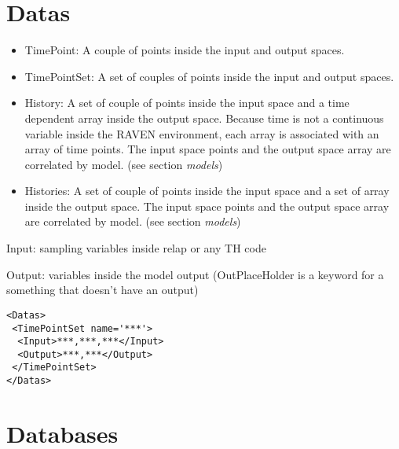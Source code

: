 \section{Datas  \\ \vspace{2 mm} {\small }}


\begin{itemize}
\item TimePoint: A couple of points inside the input and output spaces. 
\item TimePointSet: A set of couples of points inside the input and output spaces.  
\item History: A set of couple of points inside the input space and a time dependent array inside the output space. Because time is not a continuous variable inside the RAVEN environment, each array is associated with an array of time points. The input space points and the output space array are correlated by model. (see section \textit{models}) 	
\item Histories: A set of couple of points inside the input space and a set of array inside the output space. The input space points and the output space array are correlated by model. (see section \textit{models})
\end{itemize}

Input: sampling variables inside relap or any TH code

Output: variables inside the model output (OutPlaceHolder is a keyword for a something that doesn't have an output)

\begin{lstlisting}[style=XML]
<Datas> 
 <TimePointSet name='***'>  
  <Input>***,***,***</Input>
  <Output>***,***</Output>
 </TimePointSet> 
</Datas>   
\end{lstlisting}







\section{Databases}

